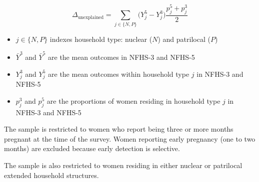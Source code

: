 \documentclass[12pt]{article}
\begin{document}
\begin{equation}
\Delta_{\text{unexplained}} =
\sum_{j \in \{N,P\}} \big(Y_j^{5} - Y_j^{3}\big)\frac{p_j^{5} + p_j^{3}}{2}
\end{equation}

\begin{itemize}
    \item $j \in \{N,P\}$ indexes household type: nuclear ($N$) and patrilocal ($P$)
    \item $\bar Y^{3}$ and $\bar Y^{5}$ are the mean outcomes in NFHS-3 and NFHS-5
    \item $Y_j^{3}$ and $Y_j^{5}$ are the mean outcomes within household type $j$ in NFHS-3 and NFHS-5
    \item $p_j^{3}$ and $p_j^{5}$ are the proportions of women residing in household type $j$ in NFHS-3 and NFHS-5
\end{itemize}

\setcounter{section}{-1}
\renewcommand{\thesection}{S.\arabic{section}}
\renewcommand{\thesubsection}{S.\arabic{section}.\arabic{subsection}}

\setcounter{table}{0}
\renewcommand{\thetable}{A\arabic{table}}
\setcounter{figure}{0}
\renewcommand{\thefigure}{A\arabic{figure}}

\begin{table}[!htbp]
    \centering
    \begin{threeparttable}[t]
        \caption{:  None of the improvement in the outcomes is explained by changing composition in household structures}
        \label{tab:decomposition}

        \scriptsize
        \setlength{\tabcolsep}{6pt}
        \renewcommand{\arraystretch}{2}

        

        \begin{tablenotes}
           \item The sample is restricted to women who report being three or more months pregnant at the time of the survey. Women reporting early pregnancy (one to two months) are excluded because early detection is selective.
            \item The sample is also restricted to women residing in either nuclear or patrilocal extended household structures. 
            
        \end{tablenotes}
    \end{threeparttable}
\end{table}
\end{document}
